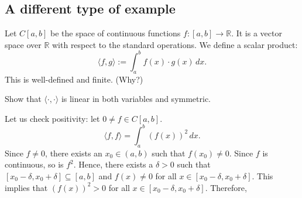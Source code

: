 \begin{example}
    \begin{center}
    \end{center}
\end{example}

\subsection{A different type of example}

\begin{example}
    Let $C[a,b]$ be the space of continuous functions $f: [a,b] \to \mathbb{R}$. It is a vector space over $\mathbb{R}$ with respect to the standard operations. 
    We define a scalar product:
    \begin{equation*}
        \langle f, g \rangle := \int_a^b f(x) \cdot g(x) \, dx.
    \end{equation*}
    This is well-defined and finite. (Why?)
\end{example}

\begin{exercise}
    Show that $\langle \cdot, \cdot \rangle$ is linear in both variables and symmetric.
\end{exercise}

Let us check positivity: let $0 \neq f \in C[a,b]$.
\begin{equation*}
    \langle f, f \rangle = \int_a^b (f(x))^2 \, dx.
\end{equation*}
Since $f \neq 0$, there exists an $x_0 \in (a,b)$ such that $f(x_0) \neq 0$. Since $f$ is continuous, so is $f^2$. Hence, there exists a $\delta > 0$ such that $[x_0 - \delta, x_0 + \delta] \subseteq [a,b]$ and $f(x) \neq 0$ for all $x \in [x_0 - \delta, x_0 + \delta]$. This implies that $(f(x))^2 > 0$ for all $x \in [x_0 - \delta, x_0 + \delta]$. Therefore,

